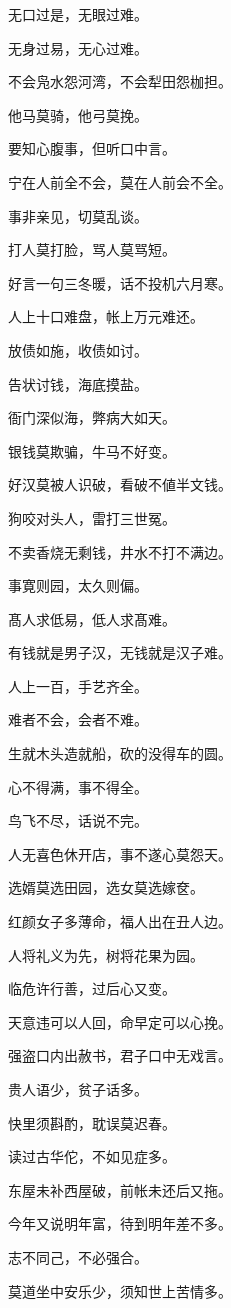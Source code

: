 \documentclass[12pt,oneside]{book}
\begin{document}
无口过是，无眼过难。

无身过易，无心过难。

不会凫水怨河湾，不会犁田怨枷担。

他马莫骑，他弓莫挽。

要知心腹事，但听口中言。

宁在人前全不会，莫在人前会不全。

事非亲见，切莫乱谈。

打人莫打脸，骂人莫骂短。

好言一句三冬暖，话不投机六月寒。

人上十口难盘，帐上万元难还。

放债如施，收债如讨。

告状讨钱，海底摸盐。

衙门深似海，弊病大如天。

银钱莫欺骗，牛马不好变。

好汉莫被人识破，看破不値半文钱。

狗咬对头人，雷打三世冤。

不卖香烧无剩钱，井水不打不满边。

事寛则园，太久则偏。

髙人求低易，低人求髙难。

有钱就是男子汉，无钱就是汉子难。

人上一百，手艺齐全。

难者不会，会者不难。

生就木头造就船，砍的没得车的圆。

心不得满，事不得全。

鸟飞不尽，话说不完。

人无喜色休开店，事不遂心莫怨天。

选婿莫选田园，选女莫选嫁奁。

红颜女子多薄命，福人出在丑人边。

人将礼义为先，树将花果为园。

临危许行善，过后心又变。

天意违可以人回，命早定可以心挽。

强盗口内出赦书，君子口中无戏言。

贵人语少，贫子话多。

快里须斟酌，耽误莫迟春。

读过古华佗，不如见症多。

东屋未补西屋破，前帐未还后又拖。

今年又说明年富，待到明年差不多。

志不同己，不必强合。

莫道坐中安乐少，须知世上苦情多。
\end{document}
